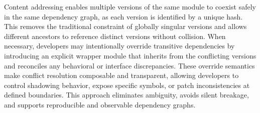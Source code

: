 \documentclass[sigplan,screen]{acmart}
\begin{document}
Content addressing enables multiple versions of the same module to coexist safely in the same dependency graph, as each version is identified by a unique hash. This removes the traditional constraint of globally singular versions and allows different ancestors to reference distinct versions without collision. When necessary, developers may intentionally override transitive dependencies by introducing an explicit wrapper module that inherits from the conflicting versions and reconciles any behavioral or interface discrepancies. These override semantics make conflict resolution composable and transparent, allowing developers to control shadowing behavior, expose specific symbols, or patch inconsistencies at defined boundaries. This approach eliminates ambiguity, avoids silent breakage, and supports reproducible and observable dependency graphs.
\end{document}
